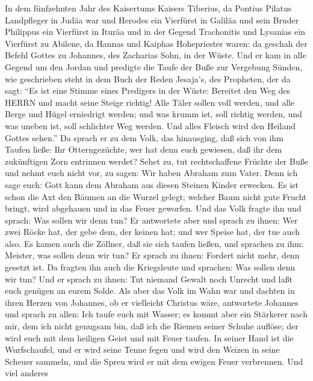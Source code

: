  In dem fünfzehnten Jahr des Kaisertums Kaisers Tiberius, da
Pontius Pilatus Landpfleger in Judäa war und Herodes ein Vierfürst in
Galiläa und sein Bruder Philippus ein Vierfürst in Ituräa und in der
Gegend Trachonitis und Lysanias ein Vierfürst zu Abilene, 
da Hannas und Kaiphas Hohepriester waren: da geschah der Befehl Gottes
zu Johannes, des Zacharias Sohn, in der Wüste.  Und er kam
in alle Gegend um den Jordan und predigte die Taufe der Buße zur
Vergebung Sünden,  wie geschrieben steht in dem Buch der
Reden Jesaja's, des Propheten, der da sagt: ``Es ist eine Stimme eines
Predigers in der Wüste: Bereitet den Weg des HERRN und macht seine
Steige richtig!  Alle Täler sollen voll werden, und alle
Berge und Hügel erniedrigt werden; und was krumm ist, soll richtig
werden, und was uneben ist, soll schlichter Weg werden.  Und
alles Fleisch wird den Heiland Gottes sehen.''  Da sprach er
zu dem Volk, das hinausging, daß sich von ihm Taufen ließe: Ihr
Otterngezüchte, wer hat denn euch gewiesen, daß ihr dem zukünftigen Zorn
entrinnen werdet?  Sehet zu, tut rechtschaffene Früchte der
Buße und nehmt euch nicht vor, zu sagen: Wir haben Abraham zum Vater.
Denn ich sage euch: Gott kann dem Abraham aus diesen Steinen Kinder
erwecken.  Es ist schon die Axt den Bäumen an die Wurzel
gelegt; welcher Baum nicht gute Frucht bringt, wird abgehauen und in das
Feuer geworfen.  Und das Volk fragte ihn und sprach: Was
sollen wir denn tun?  Er antwortete aber und sprach zu
ihnen: Wer zwei Röcke hat, der gebe dem, der keinen hat; und wer Speise
hat, der tue auch also.  Es kamen auch die Zöllner, daß sie
sich taufen ließen, und sprachen zu ihm: Meister, was sollen denn wir
tun?  Er sprach zu ihnen: Fordert nicht mehr, denn gesetzt
ist.  Da fragten ihn auch die Kriegsleute und sprachen: Was
sollen denn wir tun? Und er sprach zu ihnen: Tut niemand Gewalt noch
Unrecht und laßt euch genügen an eurem Solde.  Als aber das
Volk im Wahn war und dachten in ihren Herzen von Johannes, ob er
vielleicht Christus wäre,  antwortete Johannes und sprach
zu allen: Ich taufe euch mit Wasser; es kommt aber ein Stärkerer nach
mir, dem ich nicht genugsam bin, daß ich die Riemen seiner Schuhe
auflöse; der wird euch mit dem heiligen Geist und mit Feuer taufen.
 In seiner Hand ist die Wurfschaufel, und er wird seine
Tenne fegen und wird den Weizen in seine Scheuer sammeln, und die Spreu
wird er mit dem ewigen Feuer verbrennen.  Und viel anderes
